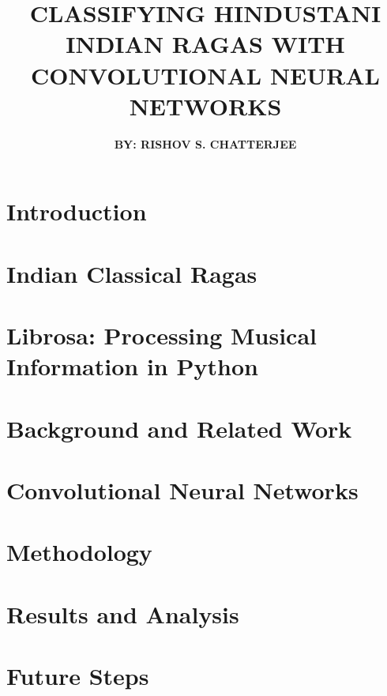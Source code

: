 \documentclass[12pt]{report}
\title{
{\textbf{CLASSIFYING HINDUSTANI INDIAN RAGAS WITH CONVOLUTIONAL NEURAL NETWORKS}}\\
}
\author{\textbf{BY: RISHOV S. CHATTERJEE}}
\begin{document}
\maketitle{}



\newpage

\newpage
\chapter*{\centering Introduction}


\chapter*{\centering Indian Classical Ragas}


\chapter*{\centering Librosa: Processing Musical Information in Python}


\chapter*{\centering Background and Related Work}


\chapter*{\centering Convolutional Neural Networks}


\chapter*{\centering Methodology}


\chapter*{\centering Results and Analysis}


\chapter*{\centering Future Steps}

\end{document}
